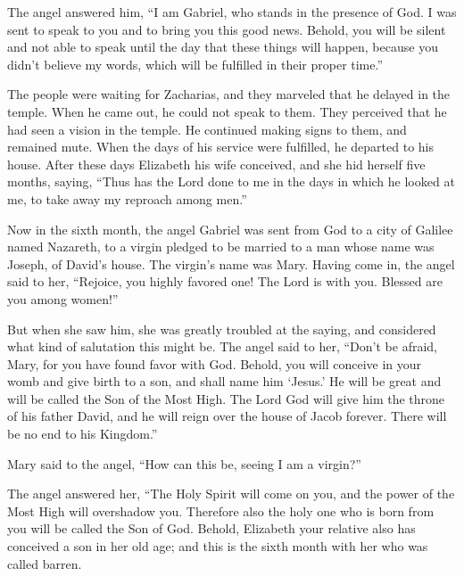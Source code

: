 {\par }{\PP {}The angel answered him, “I am Gabriel, who stands in the presence of God. I was sent to speak to you and to bring you this good news.
Behold, you will be silent and not able to speak until the day that these things will happen, because you didn’t believe my words, which will be fulfilled in their proper time.”
\par }{\PP {}The people were waiting for Zacharias, and they marveled that he delayed in the temple.
When he came out, he could not speak to them. They perceived that he had seen a vision in the temple. He continued making signs to them, and remained mute.
When the days of his service were fulfilled, he departed to his house.
After these days Elizabeth his wife conceived, and she hid herself five months, saying,
“Thus has the Lord done to me in the days in which he looked at me, to take away my reproach among men.”
\par }{\PP {}Now in the sixth month, the angel Gabriel was sent from God to a city of Galilee named Nazareth,
to a virgin pledged to be married to a man whose name was Joseph, of David’s house. The virgin’s name was Mary.
Having come in, the angel said to her, “Rejoice, you highly favored one! The Lord is with you. Blessed are you among women!”
\par }{\PP {}But when she saw him, she was greatly troubled at the saying, and considered what kind of salutation this might be.
The angel said to her, “Don’t be afraid, Mary, for you have found favor with God.
Behold, you will conceive in your womb and give birth to a son, and shall name him ‘Jesus.’
He will be great and will be called the Son of the Most High. The Lord God will give him the throne of his father David,
and he will reign over the house of Jacob forever. There will be no end to his Kingdom.”
\par }{\PP {}Mary said to the angel, “How can this be, seeing I am a virgin?”
\par }{\PP {}The angel answered her, “The Holy Spirit will come on you, and the power of the Most High will overshadow you. Therefore also the holy one who is born from you will be called the Son of God.
Behold, Elizabeth your relative also has conceived a son in her old age; and this is the sixth month with her who was called barren.
}
